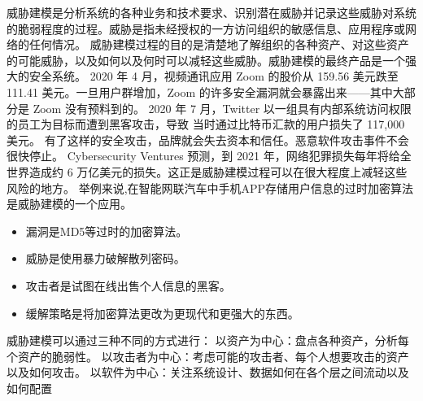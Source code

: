 威胁建模是分析系统的各种业务和技术要求、识别潜在威胁并记录这些威胁对系统的脆弱程度的过程。威胁是指未经授权的一方访问组织的敏感信息、应用程序或网络的任何情况。 
威胁建模过程的目的是清楚地了解组织的各种资产、对这些资产的可能威胁，以及如何以及何时可以减轻这些威胁。威胁建模的最终产品是一个强大的安全系统。 
2020 年 4 月，视频通讯应用 Zoom 的股价从 159.56 美元跌至 111.41 美元。一旦用户群增加，Zoom 的许多安全漏洞就会暴露出来——其中大部分是 Zoom 没有预料到的。
2020 年 7 月，Twitter 以一组具有内部系统访问权限的员工为目标而遭到黑客攻击，导致 当时通过比特币汇款的用户损失了 117,000 美元。 
有了这样的安全攻击，品牌就会失去资本和信任。恶意软件攻击事件不会很快停止。
Cyber​​security Ventures 预测\cite{apache1}，到 2021 年，网络犯罪损失每年将给全世界造成约 6 万亿美元的损失。这正是威胁建模过程可以在很大程度上减轻这些风险的地方。 
\newline
举例来说,在智能网联汽车中手机APP存储用户信息的过时加密算法是威胁建模的一个应用。
\begin{itemize}
    \item 漏洞是MD5等过时的加密算法。
    \item 威胁是使用暴力破解散列密码。
    \item 攻击者是试图在线出售个人信息的黑客。
    \item 缓解策略是将加密算法更改为更现代和更强大的东西。
  \end{itemize}
威胁建模可以通过三种不同的方式进行： 
\newline
以资产为中心：盘点各种资产，分析每个资产的脆弱性。
\newline 
以攻击者为中心：考虑可能的攻击者、每个人想要攻击的资产以及如何攻击。
\newline
以软件为中心：关注系统设计、数据如何在各个层之间流动以及如何配置
